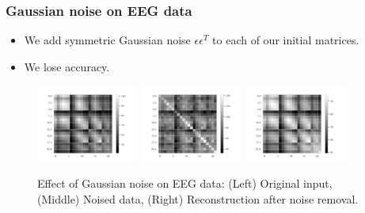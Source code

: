 \documentclass{beamer}
\begin{document}
\begin{frame}
    \frametitle{Gaussian noise on EEG data}
    \begin{itemize}
        \item We add symmetric Gaussian noise $\epsilon \epsilon^T$ to each of our initial matrices.
        \item We lose accuracy.
    \end{itemize}
    
    \begin{figure}
        \centering
        \includegraphics[width=0.3\textwidth]{figures/channel4_encoding_dim10_example_input_test.png}
        \includegraphics[width=0.3\textwidth]{figures/channel4_encoding_dim10_example_noised_test.png}
        \includegraphics[width=0.3\textwidth]{figures/channel4_encoding_dim10_example_reconstruction_test.png}
        \caption{Effect of Gaussian noise on EEG data: (Left) Original input, (Middle) Noised data, (Right) Reconstruction after noise removal.}
    \end{figure}
\end{frame}
\end{document}
